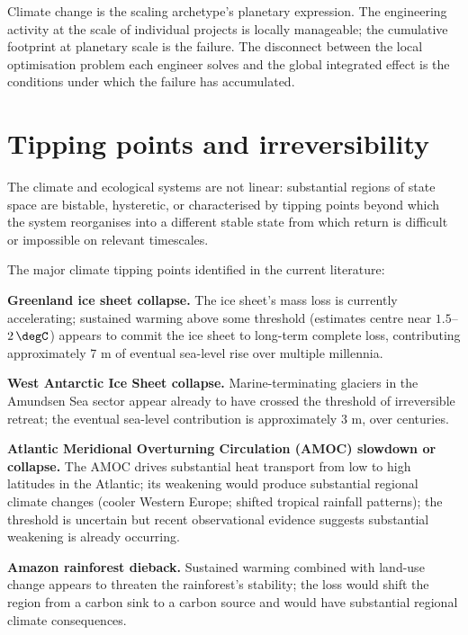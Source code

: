 \begin{archetype}[scaling]
Climate change is the scaling archetype's planetary expression. The engineering activity at the scale of individual projects is locally manageable; the cumulative footprint at planetary scale is the failure. The disconnect between the local optimisation problem each engineer solves and the global integrated effect is the conditions under which the failure has accumulated.
\end{archetype}

\section{Tipping points and irreversibility}

The climate and ecological systems are not linear: substantial regions of state space are bistable, hysteretic, or characterised by tipping points beyond which the system reorganises into a different stable state from which return is difficult or impossible on relevant timescales.

The major climate tipping points identified in the current literature:

\textbf{Greenland ice sheet collapse.} The ice sheet's mass loss is currently accelerating; sustained warming above some threshold (estimates centre near $1.5$--$2\,\degC$) appears to commit the ice sheet to long-term complete loss, contributing approximately 7 m of eventual sea-level rise over multiple millennia.

\textbf{West Antarctic Ice Sheet collapse.} Marine-terminating glaciers in the Amundsen Sea sector appear already to have crossed the threshold of irreversible retreat; the eventual sea-level contribution is approximately 3 m, over centuries.

\textbf{Atlantic Meridional Overturning Circulation (AMOC) slowdown or collapse.} The AMOC drives substantial heat transport from low to high latitudes in the Atlantic; its weakening would produce substantial regional climate changes (cooler Western Europe; shifted tropical rainfall patterns); the threshold is uncertain but recent observational evidence suggests substantial weakening is already occurring.

\textbf{Amazon rainforest dieback.} Sustained warming combined with land-use change appears to threaten the rainforest's stability; the loss would shift the region from a carbon sink to a carbon source and would have substantial regional climate consequences.

